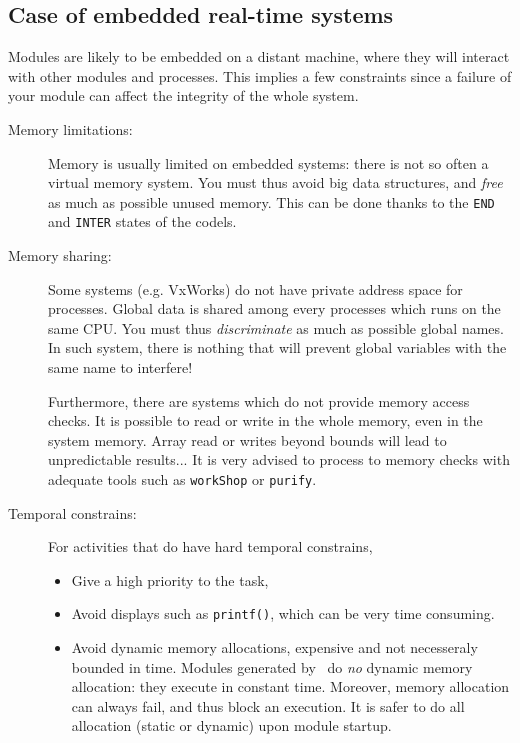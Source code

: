 \subsection{Case of embedded real-time systems}

Modules are likely  to be embedded on  a distant machine, where they will
interact  with other modules  and     processes.   This implies a     few
constraints since a  failure of your module can  affect the integrity  of
the whole system.

\begin{description}
\item[Memory limitations:]
Memory is  usually limited on  embedded systems: there is  not so often a
virtual memory system. You must thus avoid big  data structures, and {\em
free} as much as  possible unused memory. This  can be done thanks to the
{\tt END} and {\tt INTER} states of the codels.

\item[Memory sharing:]
Some  systems (e.g. VxWorks)   do not  have   private address  space  for
processes. Global data is shared among every processes  which runs on the
same CPU. You  must thus {\em  discriminate} as  much  as possible global
names.  In   such system, there   is nothing  that will   prevent  global
variables with the same name to interfere!

Furthermore, there are systems which do not provide memory access checks.
It is possible to read or write  in the whole memory,  even in the system
memory.  Array read or writes   beyond bounds will  lead to unpredictable
results...  It is very advised to  process to memory checks with adequate
tools such as {\tt workShop} or {\tt purify}.

\item[Temporal constrains:]

For activities that do have hard temporal constrains,
\begin{itemize}
\item Give a high priority to the task,
\item Avoid displays such as {\tt printf()}, which can be very time
consuming.
\item Avoid dynamic memory allocations, expensive and not necesseraly
bounded in time.  Modules generated by \GenoM\ do {\em no} dynamic memory
allocation: they execute in  constant time.  Moreover, memory  allocation
can always fail, and  thus block  an execution.  It  is  safer to do  all
allocation (static or dynamic) upon module startup.
\end{itemize} 


\end{description}
